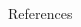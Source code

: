 \documentclass{resume_short} %
\begin{document}
\begin{paracol}{2}
\begin{rSection}{References}{}
  \end{rSection}

\end{paracol}
\end{document}
